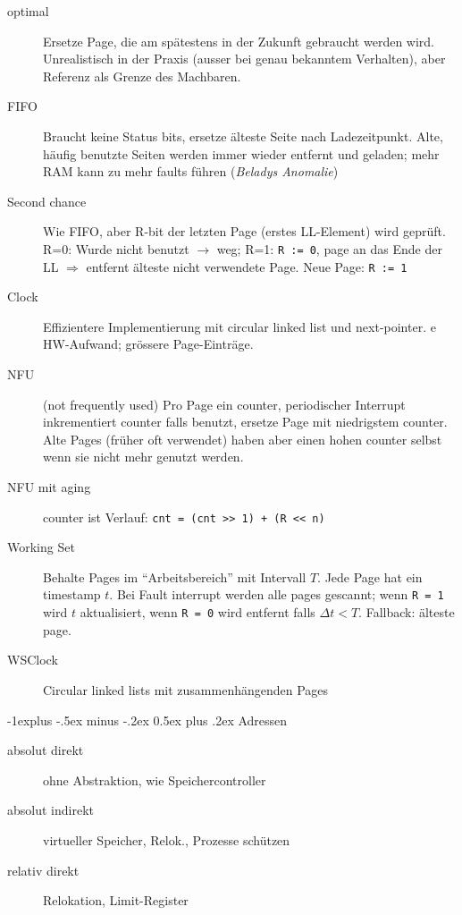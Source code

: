 \documentclass[10pt,landscape,a4paper]{article}
\makeatletter
\renewcommand{\subsection}{\@startsection{subsection}{2}{0mm}%
                                {-1explus -.5ex minus -.2ex}%
                                {0.5ex plus .2ex}%
                                {\normalfont\small\bfseries}}
\makeatother
\begin{document}
\begin{multicols*}{3}
\begin{description}
  \item[optimal] Ersetze Page, die am spätestens in der Zukunft gebraucht werden
    wird. Unrealistisch in der Praxis (ausser bei genau bekanntem Verhalten), aber
    Referenz als Grenze des Machbaren.
  \item[FIFO] Braucht keine Status bits, ersetze älteste Seite nach Ladezeitpunkt.
    Alte, häufig benutzte Seiten werden immer wieder entfernt und geladen; mehr
    RAM kann zu mehr faults führen (\emph{Beladys Anomalie})
  \item[Second chance] Wie FIFO, aber R-bit der letzten Page (erstes LL-Element)
    wird geprüft. R=0: Wurde nicht benutzt $\rightarrow$ weg; R=1:
    \verb|R := 0|, page an das Ende der LL $\Rightarrow$ entfernt älteste nicht
    verwendete Page. Neue Page: \verb|R := 1|
  \item[Clock] Effizientere Implementierung mit circular linked list und next-pointer.
    e
    HW-Aufwand; grössere Page-Einträge.
  \item[NFU] (not frequently used) Pro Page ein counter, periodischer Interrupt
    inkrementiert counter falls benutzt, ersetze Page mit niedrigstem counter. Alte Pages
    (früher oft verwendet) haben aber einen hohen counter selbst wenn sie nicht
    mehr genutzt werden.
  \item[NFU mit aging] counter ist Verlauf: \verb|cnt = (cnt >> 1) + (R << n)|
  \item[Working Set] Behalte Pages im ``Arbeitsbereich'' mit Intervall $T$. Jede
    Page hat ein timestamp $t$. Bei Fault interrupt werden alle pages gescannt;
    wenn \verb|R = 1| wird $t$ aktualisiert, wenn \verb|R = 0| wird entfernt
    falls $\Delta{}t < T$. Fallback: älteste page.
  \item[WSClock] Circular linked lists mit zusammenhängenden Pages
\end{description}

\subsection{Adressen}

\begin{description}
  \item[absolut direkt] ohne Abstraktion, wie Speichercontroller
  \item[absolut indirekt] virtueller Speicher, Relok., Prozesse schützen
  \item[relativ direkt] Relokation, Limit-Register
\end{description}


\end{multicols*}
\end{document}
